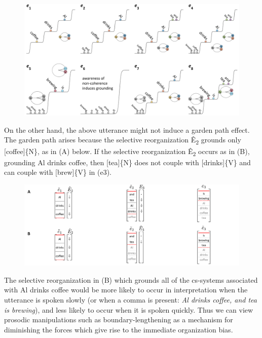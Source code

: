   
\begin{figure}
\includegraphics[width=\textwidth]{figures/Tilsen-img130.png}
\caption{\missingcaption}
\label{fig:6:11}
\end{figure}
 

  On the other hand, the above utterance might not induce a garden path effect. The garden path arises because the selective reorganization Ê\textsubscript{2} grounds only [coffee]\{N\}, as in (A) below. If the selective reorganization Ê\textsubscript{2} occurs as in (B), grounding {\textbar}Al drinks coffee{\textbar}, then [tea]\{N\} does not couple with [drinks]\{V\} and can couple with [brew]\{V\} in (e3).

  
\begin{figure}
\includegraphics[width=\textwidth]{figures/Tilsen-img131.png}
\caption{\missingcaption}
\label{fig:6:12}
\end{figure}
 

  The selective reorganization in (B) which grounds all of the cs-systems associated with {\textbar}Al drinks coffee{\textbar} would be more likely to occur in interpretation when the utterance is spoken slowly (or when a comma is present: \textit{Al drinks coffee, and tea is brewing}), and less likely to occur when it is spoken quickly. Thus we can view prosodic manipulations such as boundary-lengthening as a mechanism for diminishing the forces which give rise to the immediate organization bias.

